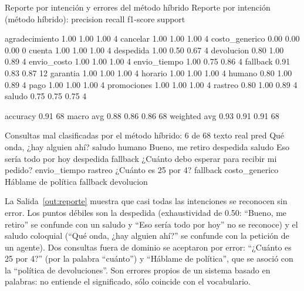 \documentclass[11pt,letterpaper]{article}
\begin{document}
\begin{consola}[label=out:reporte]{Reporte por intención y errores del método híbrido}
Reporte por intención (método híbrido):
                precision    recall  f1-score   support

agradecimiento       1.00      1.00      1.00         4
      cancelar       1.00      1.00      1.00         4
costo_generico       0.00      0.00      0.00         0
        cuenta       1.00      1.00      1.00         4
     despedida       1.00      0.50      0.67         4
    devolucion       0.80      1.00      0.89         4
   envio_costo       1.00      1.00      1.00         4
  envio_tiempo       1.00      0.75      0.86         4
      fallback       0.91      0.83      0.87        12
      garantia       1.00      1.00      1.00         4
       horario       1.00      1.00      1.00         4
        humano       0.80      1.00      0.89         4
          pago       1.00      1.00      1.00         4
   promociones       1.00      1.00      1.00         4
       rastreo       0.80      1.00      0.89         4
        saludo       0.75      0.75      0.75         4

      accuracy                           0.91        68
     macro avg       0.88      0.86      0.86        68
  weighted avg       0.93      0.91      0.91        68

Consultas mal clasificadas por el método híbrido: 6 de 68
                                       texto         real           pred
                 Qué onda, ¿hay alguien ahí?       saludo         humano
                            Bueno, me retiro    despedida         saludo
                      Eso sería todo por hoy    despedida       fallback
¿Cuánto debo esperar para recibir mi pedido? envio_tiempo        rastreo
                        ¿Cuánto es 25 por 4?     fallback costo_generico
                         Háblame de política     fallback     devolucion
\end{consola}

La Salida~\ref{out:reporte} muestra que casi todas las intenciones se reconocen sin error. Los puntos débiles son la despedida (exhaustividad de 0.50: ``Bueno, me retiro'' se confunde con un saludo y ``Eso sería todo por hoy'' no se reconoce) y el saludo coloquial (``Qué onda, ¿hay alguien ahí?'' se confunde con la petición de un agente). Dos consultas fuera de dominio se aceptaron por error: ``¿Cuánto es 25 por 4?'' (por la palabra ``cuánto'') y ``Háblame de política'', que se asoció con la ``política de devoluciones''. Son errores propios de un sistema basado en palabras: no entiende el significado, sólo coincide con el vocabulario.
\end{document}
